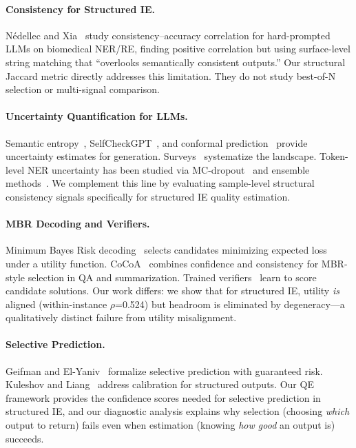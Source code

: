 \documentclass[11pt,a4paper]{article}
\begin{document}
\paragraph{Consistency for Structured IE.}
N\'{e}dellec and Xia~\cite{nedellec2026} study consistency--accuracy correlation for hard-prompted LLMs on biomedical NER/RE, finding positive correlation but using surface-level string matching that ``overlooks semantically consistent outputs.'' Our structural Jaccard metric directly addresses this limitation. They do not study best-of-N selection or multi-signal comparison.

\paragraph{Uncertainty Quantification for LLMs.}
Semantic entropy~\cite{kuhn2023semantic}, SelfCheckGPT~\cite{manakul2023selfcheckgpt}, and conformal prediction~\cite{fisch2021,angelopoulos2021} provide uncertainty estimates for generation. Surveys~\cite{uqsurvey2025,calibsurvey2025} systematize the landscape. Token-level NER uncertainty has been studied via MC-dropout~\cite{shelmanov2021} and ensemble methods~\cite{lakshminarayanan2017}. We complement this line by evaluating sample-level structural consistency signals specifically for structured IE quality estimation.

\paragraph{MBR Decoding and Verifiers.}
Minimum Bayes Risk decoding~\cite{eikema2022} selects candidates minimizing expected loss under a utility function. CoCoA~\cite{cocoa2025} combines confidence and consistency for MBR-style selection in QA and summarization. Trained verifiers~\cite{cobbe2021,lightman2023} learn to score candidate solutions. Our work differs: we show that for structured IE, utility \emph{is} aligned (within-instance $\rho$=0.524) but headroom is eliminated by degeneracy---a qualitatively distinct failure from utility misalignment.

\paragraph{Selective Prediction.}
Geifman and El-Yaniv~\cite{geifman2017} formalize selective prediction with guaranteed risk. Kuleshov and Liang~\cite{kuleshov2015} address calibration for structured outputs. Our QE framework provides the confidence scores needed for selective prediction in structured IE, and our diagnostic analysis explains why selection (choosing \emph{which} output to return) fails even when estimation (knowing \emph{how good} an output is) succeeds.
\end{document}
